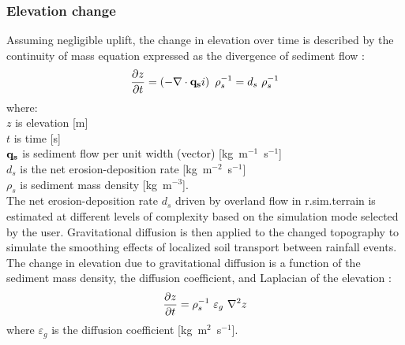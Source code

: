 \documentclass[gmd, manuscript]{copernicus}
\begin{document}
\subsubsection{Elevation change} 
Assuming negligible uplift, the change in elevation over time 
is described by the continuity of mass equation 
expressed as the divergence of sediment flow  \citep{Tucker2001}:
\begin{equation}
\label{eq:evolution} 
{\partial z \over \partial t } = \left (-\nabla \cdot {\bf q_s}i \right ) ~ \rho_s^{-1} = d_s ~ \rho_s^{-1} 
\end{equation}
{\small
where: \\
\noindent
\hspace*{0.5em} $z$ is elevation [\unit{m}] \\
\hspace*{0.5em} $t$ is time [\unit{s}] \\
\hspace*{0.5em} ${\bf q_s}$ is sediment flow per unit width (vector) [\unit{kg~m}$^{-1}$~\unit{s}$^{-1}$]\\
\hspace*{0.5em} $d_s$ is the net erosion-deposition rate [\unit{kg~m}$^{-2}$~\unit{s}$^{-1}$]\\
\hspace*{0.5em} $\rho_s$ is sediment mass density [\unit{kg~m}$^{-3}$].\\
}
The net erosion-deposition rate $d_s$ driven by overland flow
in r.sim.terrain is estimated at different levels of complexity based 
on the simulation mode selected by the user.
Gravitational diffusion is then applied to the changed topography 
to simulate the smoothing effects 
of localized soil transport between rainfall events.
The change in elevation due to gravitational diffusion
is a function of the sediment mass density,
the diffusion coefficient, and Laplacian of the elevation
\citep{Thaxton2004}:
\begin{equation}
\label{eq:grav_diffusion} 
{\partial z \over \partial t } = \rho_s^{-1} ~ \varepsilon_g ~ \nabla^2 z 
\end{equation}
\noindent
where $\varepsilon_g$ is the diffusion coefficient [\unit{kg~m}$^{2}$~\unit{s}$^{-1}$].
\end{document}
